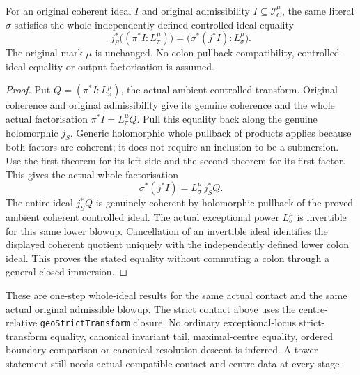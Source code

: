 \begin{theorem}
\label{hir:actual-closed-contact-whole-controlled-ideal-restriction}
\leanok
For an original coherent ideal $I$ and original admissibility
$I\subseteq\mathcal I_C^\mu$, the same literal $\sigma$ satisfies the
whole independently defined controlled-ideal equality
\[
 j_S^*\bigl((\pi^*I:L_\pi^\mu)\bigr)
   =\bigl(\sigma^*(j^*I):L_\sigma^\mu\bigr).
\]
The original mark $\mu$ is unchanged. No colon-pullback compatibility,
controlled-ideal equality or output factorisation is assumed.
\end{theorem}
\begin{proof}
Put $Q=(\pi^*I:L_\pi^\mu)$, the actual ambient controlled
transform. Original coherence and original admissibility give its
genuine coherence and the whole actual factorisation
$\pi^*I=L_\pi^\mu Q$. Pull this equality back along the genuine
holomorphic $j_S$. Generic holomorphic whole pullback of products
applies because both factors are coherent; it does not require an
inclusion to be a submersion. Use the first theorem for its left side
and the second theorem for its first factor. This gives the actual
whole factorisation
\[
 \sigma^*(j^*I)=L_\sigma^\mu\,j_S^*Q.
\]
The entire ideal $j_S^*Q$ is genuinely coherent by holomorphic
pullback of the proved ambient coherent controlled ideal. The actual
exceptional power $L_\sigma^\mu$ is invertible for this same lower
blowup. Cancellation of an invertible ideal identifies the displayed
coherent quotient uniquely with the independently defined lower colon
ideal. This proves the stated equality without commuting a colon
through a general closed immersion.
\end{proof}

These are one-step whole-ideal results for the same actual contact and
the same actual original admissible blowup. The strict contact above
uses the centre-relative \texttt{geoStrictTransform} closure. No ordinary
exceptional-locus strict-transform equality, canonical invariant tail,
maximal-centre equality, ordered boundary comparison or canonical
resolution descent is inferred. A tower statement still needs actual
compatible contact and centre data at every stage.
